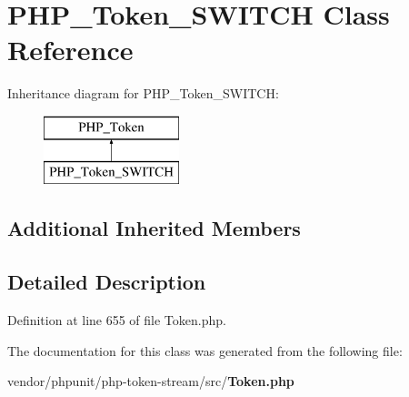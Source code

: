 \section{P\+H\+P\+\_\+\+Token\+\_\+\+S\+W\+I\+T\+C\+H Class Reference}
\label{class_p_h_p___token___s_w_i_t_c_h}
Inheritance diagram for P\+H\+P\+\_\+\+Token\+\_\+\+S\+W\+I\+T\+C\+H\+:\begin{figure}[H]
\begin{center}
\leavevmode
\includegraphics[height=2.000000cm]{class_p_h_p___token___s_w_i_t_c_h}
\end{center}
\end{figure}
\subsection*{Additional Inherited Members}


\subsection{Detailed Description}


Definition at line 655 of file Token.\+php.



The documentation for this class was generated from the following file\+:\begin{DoxyCompactItemize}
\item 
vendor/phpunit/php-\/token-\/stream/src/{\bf Token.\+php}\end{DoxyCompactItemize}

